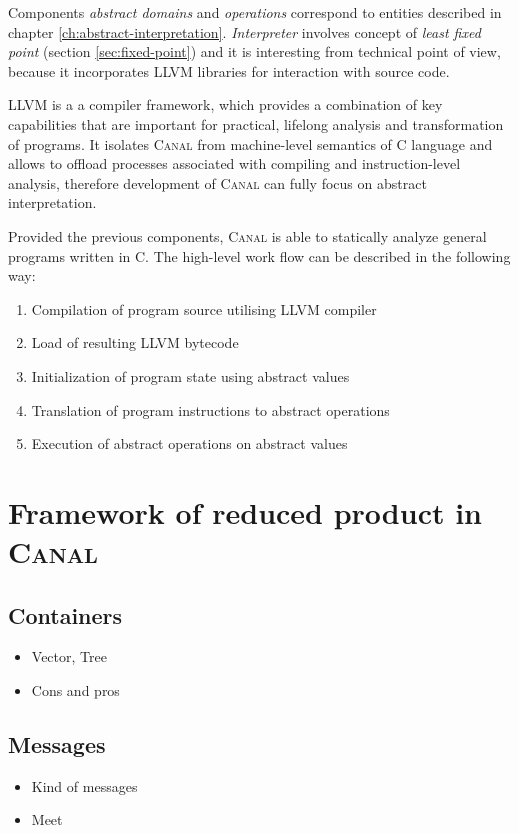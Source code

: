\documentclass[12pt,oneside]{fithesis2}
\theoremstyle{definition}
\begin{document}
Components \textit{abstract domains} and \textit{operations} correspond to entities described in chapter \ref{ch:abstract-interpretation}. \textit{Interpreter} involves concept of \textit{least fixed point} (section \ref{sec:fixed-point}) and it is interesting from technical point of view, because it incorporates LLVM libraries for interaction with source code.

LLVM is a a compiler framework, which provides a combination of key capabilities that are important for practical, lifelong analysis and
transformation of programs. \cite{llvm} It isolates \textsc{Canal} from machine-level semantics of C language and allows to offload processes associated with compiling and instruction-level analysis, therefore development of \textsc{Canal} can fully focus on abstract interpretation.

Provided the previous components, \textsc{Canal} is able to statically analyze general programs written in C. The high-level work flow can be described in the following way:

\begin{enumerate}
  \item Compilation of program source utilising LLVM compiler
  \item Load of resulting LLVM bytecode
  \item Initialization of program state using abstract values
  \item Translation of program instructions to abstract operations
  \item Execution of abstract operations on abstract values
\end{enumerate}

\section{Framework of reduced product in \textsc{Canal}}

\subsection{Containers}
\begin{itemize}
  \item Vector, Tree
  \item Cons and pros
\end{itemize}

\subsection{Messages}
\begin{itemize}
  \item Kind of messages
  \item Meet
\end{itemize}
\end{document}
